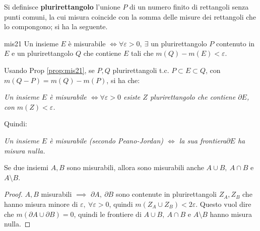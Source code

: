 \documentclass[10pt, a4paper]{scrartcl}
\theoremstyle{definition}
\numberwithin{esempio}{section}
\theoremstyle{definition}
\numberwithin{obs}{section}
\numberwithin{nota}{section}
\numberwithin{equation}{subsection}
\begin{document}
Si definisce \textbf{plurirettangolo} l'unione $P$ di un numero finito di rettangoli senza punti comuni, la cui misura coincide con la somma delle misure dei rettangoli che lo compongono; si ha la seguente.
\begin{prop}
	{}{mis21}
	Un insieme $E$ \`e misurabile $\iff \forall \varepsilon >0, \ \exists $ un plurirettangolo $P$ contenuto in $E$ e un plurirettangolo $Q$ che contiene $E$ tali che $m(Q) - m(E) < \varepsilon $.
\end{prop}
\noindent Usando Prop \ref{prop:mis21}, se $P,Q$ plurirettangoli t.c. $P \subset E \subset Q$, con $m(Q-P) = m(Q) - m(P)$, si ha che:
\begin{center}
	\textit{Un insieme $E$ \`e misurabile $\iff \forall \varepsilon > 0$ esiste $Z$ plurirettangolo che contiene $\partial E$, con $m(Z)<\varepsilon $.} 
\end{center}
Quindi:
\begin{center}
	\textit{Un insieme $E$ \`e misurabile (secondo Peano-Jordan) $\iff$ la sua frontiera\newline $\partial E$ ha misura nulla.} 
\end{center}
\begin{prop}
	{}{}
	Se due insiemi $A,B$ sono misurabili, allora sono misurabili anche $A \cup B , \ A \cap B $ e $A \setminus B$.
	\begin{proof}
		$A,B$ misurabili $\implies$ $\partial A, \ \partial B$ sono contenute in plurirettangoli $Z_A,Z_B$ che hanno misura minore di $\varepsilon , \ \forall \varepsilon >0$, quindi $m(Z_A \cup Z_B) < 2 \varepsilon $. Questo vuol dire che $m(\partial A \cup \partial B) = 0$, quindi le frontiere di $A\cup B , \ A \cap B $ e $A \setminus B$ hanno misura nulla.
	\end{proof}
\end{prop}
\end{document}
